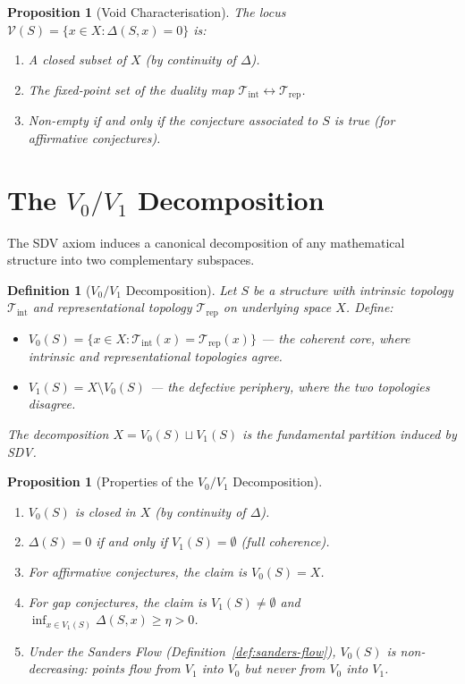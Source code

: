 \documentclass[12pt, openany]{book}
\newtheorem{proposition}[theorem]{Proposition}
\newtheorem{definition}[theorem]{Definition}
\theoremstyle{remark}
\newcommand{\Tint}{\mathcal{T}_{\mathrm{int}}}
\newcommand{\Trep}{\mathcal{T}_{\mathrm{rep}}}
\begin{document}
\begin{proposition}[Void Characterisation]
\label{prop:void}
The locus $\mathcal{V}(S) = \{x \in X : \Delta(S, x) = 0\}$ is:
\begin{enumerate}
  \item A closed subset of $X$ (by continuity of $\Delta$).
  \item The fixed-point set of the duality map $\Tint \leftrightarrow \Trep$.
  \item Non-empty if and only if the conjecture associated to $S$ is true
        (for affirmative conjectures).
\end{enumerate}
\end{proposition}

\section{The $V_0 / V_1$ Decomposition}
\label{sec:v0v1}

The SDV axiom induces a canonical decomposition of any mathematical structure
into two complementary subspaces.

\begin{definition}[$V_0 / V_1$ Decomposition]\label{def:v0v1}
Let $S$ be a structure with intrinsic topology $\Tint$ and representational
topology $\Trep$ on underlying space $X$. Define:
\begin{itemize}
  \item $V_0(S) = \{x \in X : \Tint(x) = \Trep(x)\}$ --- the \emph{coherent core},
        where intrinsic and representational topologies agree.
  \item $V_1(S) = X \setminus V_0(S)$ --- the \emph{defective periphery},
        where the two topologies disagree.
\end{itemize}
The decomposition $X = V_0(S) \sqcup V_1(S)$ is the fundamental partition induced
by SDV.
\end{definition}

\begin{proposition}[Properties of the $V_0 / V_1$ Decomposition]\label{prop:v0v1-props}
\begin{enumerate}
  \item $V_0(S)$ is closed in $X$ (by continuity of $\Delta$).
  \item $\Delta(S) = 0$ if and only if $V_1(S) = \emptyset$ (full coherence).
  \item For affirmative conjectures, the claim is $V_0(S) = X$.
  \item For gap conjectures, the claim is $V_1(S) \neq \emptyset$ and
        $\inf_{x \in V_1(S)} \Delta(S, x) \geq \eta > 0$.
  \item Under the Sanders Flow (Definition~\ref{def:sanders-flow}), $V_0(S)$ is
        non-decreasing: points flow from $V_1$ into $V_0$ but never from $V_0$ into $V_1$.
\end{enumerate}
\end{proposition}
\end{document}
